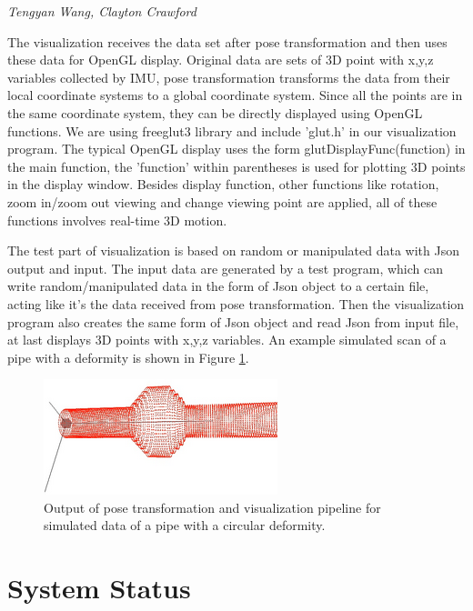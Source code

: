 \documentclass[twocolumn]{article}
\begin{document}
\emph{Tengyan Wang, Clayton Crawford}

The visualization receives the data set after pose transformation and then uses
these data for OpenGL display. Original data are sets of 3D point with x,y,z
variables collected by IMU, pose transformation transforms the data from their
local coordinate systems to a global coordinate system. Since all the points are
in the same coordinate system, they can be directly displayed using OpenGL
functions. We are using freeglut3 library and include 'glut.h' in our
visualization program. The typical OpenGL display uses the form
glutDisplayFunc(function) in the main function, the 'function' within
parentheses is used for plotting 3D points in the display window. Besides
display function, other functions like rotation, zoom in/zoom out viewing and
change viewing point are applied, all of these functions involves real-time 3D
motion.

The test part of visualization is based on random or manipulated data with Json
output and input. The input data are generated by a test program, which can
write random/manipulated data in the form of Json object to a certain file,
acting like it's the data received from pose transformation. Then the
visualization program also creates the same form of Json object and read Json
from input file, at last displays 3D points with x,y,z variables. An example
simulated scan of a pipe with a deformity is shown in Figure
\ref{fig:simulated-pipe-deformity}.

\begin{figure}
  \centering
  \includegraphics[width=\columnwidth]{simulated-pipe-deformity}
  \caption{Output of pose transformation and visualization pipeline for
    simulated data of a pipe with a circular deformity.}
  \label{fig:simulated-pipe-deformity}
\end{figure}

\section{System Status}
\end{document}
